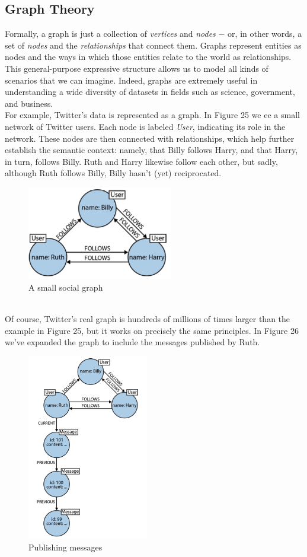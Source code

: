 \documentclass[10pt,a4paper]{article}
\begin{document}
\subsection{Graph Theory}
Formally, a graph is just a collection of \textit{vertices} and \textit{nodes} $-$ or, in other words, a set of \textit{nodes} and the \textit{relationships} that connect them. Graphs represent entities as nodes and the ways in which those entities relate to the world as relationships. This general-purpose expressive structure allows us to model all kinds of scenarios that we can imagine.
Indeed, graphs are extremely useful in understanding a wide diversity of datasets in fields such as science, government, and business. \\ For example, Twitter's data is represented as a graph. In Figure 25 we ee a small network of Twitter users. Each node is labeled \textit{User}, indicating its role in the network. These nodes are then connected with relationships, which help further establish the semantic context: namely, that Billy follows Harry, and that Harry, in turn, follows Billy. Ruth and Harry likewise follow each other, but sadly, although Ruth follows Billy, Billy hasn't (yet) reciprocated.
\begin{figure}[h!]
 \hfill \includegraphics[width=180pt]{images/twitter-graph.png}\hspace*{\fill}
  \caption{A small social graph}
\end{figure} \\
Of course, Twitter’s real graph is hundreds of millions of times larger than the example in Figure 25, but it works on precisely the same principles. In Figure 26 we’ve expanded the graph to include the messages published by Ruth. \pagebreak
\begin{figure}[h!]
 \hfill \includegraphics[width=150pt]{images/twitter-graph2.png}\hspace*{\fill}
  \caption{Publishing messages}
\end{figure} \\
\end{document}
